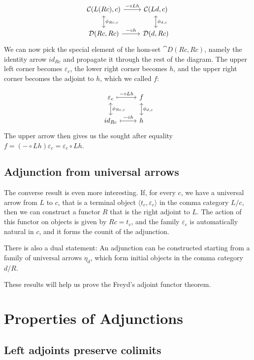 \documentclass[DaoFP]{subfiles}
\begin{document}
\[
 \begin{tikzcd}
 \mathcal{C}(L (R c), c)
 \arrow[d, leftrightarrow, "\phi_{R c, c}"]
 \arrow[r, "- \circ L h"]
 &
 \mathcal{C}(L d, c)
  \arrow[d, leftrightarrow, "\phi_{d, c}"]
 \\
 \mathcal{D}(R c, R c)
 \arrow[r, "- \circ h"]
& \mathcal{D}(d, R c)
 \end{tikzcd}
\]
We can now pick the special element of the hom-set $\cat D(R c, R c)$, namely the identity arrow $id_{R c}$ and propagate it through the rest of the diagram. The upper left corner becomes $\varepsilon_c$, the lower right corner becomes $h$, and the upper right corner becomes the adjoint to $h$, which we called $f$:

\[
 \begin{tikzcd}
\varepsilon_c
 \arrow[d, leftrightarrow, "\phi_{R c, c}"]
 \arrow[r, maps to, "- \circ L h"]
 &
f
  \arrow[d, leftrightarrow, "\phi_{d, c}"]
 \\
id_{R c}
 \arrow[r, maps to, "- \circ h"]
& h
 \end{tikzcd}
\]
The upper arrow then gives us the sought after equality $f = (- \circ L h) \varepsilon_c = \varepsilon_c \circ L h$.

\subsection{Adjunction from universal arrows}

The converse result is even more interesting. If, for every $c$, we have a universal arrow from $L$ to $c$, that is a terminal object $\langle t_c, \varepsilon_c \rangle$ in the comma category $L/c$, then we can construct a functor $R$ that is the right adjoint to $L$. The action of this functor on objects is given by $R c = t_c$, and the family $\varepsilon_c$ is automatically natural in $c$, and it forms the counit of the adjunction.

There is also a dual statement: An adjunction can be constructed starting from a family of universal arrows $\eta_d$, which form initial objects in the comma category $d/R$. 

These results will help us prove the Freyd's adjoint functor theorem. 

\section{Properties of Adjunctions}

\subsection{Left adjoints preserve colimits}
\end{document}
